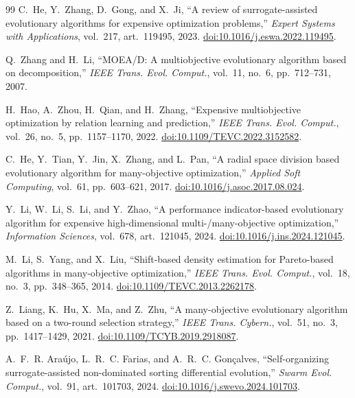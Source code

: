 \documentclass[final,5p,times,twocolumn]{elsarticle}
\begin{document}
\begin{thebibliography}{99}
C.~He, Y.~Zhang, D.~Gong, and X.~Ji,
``A review of surrogate-assisted evolutionary algorithms for expensive
optimization problems,'' \emph{Expert Systems with Applications}, vol.~217,
art.~119495, 2023.
\href{https://doi.org/10.1016/j.eswa.2022.119495}{doi:10.1016/j.eswa.2022.119495}.

Q.~Zhang and H.~Li,
``MOEA/D: A multiobjective evolutionary algorithm based on decomposition,''
\emph{IEEE Trans. Evol. Comput.}, vol.~11, no.~6, pp.~712--731, 2007.

H.~Hao, A.~Zhou, H.~Qian, and H.~Zhang,
``Expensive multiobjective optimization by relation learning and prediction,''
\emph{IEEE Trans. Evol. Comput.}, vol.~26, no.~5, pp.~1157--1170, 2022.
\href{https://doi.org/10.1109/TEVC.2022.3152582}{doi:10.1109/TEVC.2022.3152582}.

C.~He, Y.~Tian, Y.~Jin, X.~Zhang, and L.~Pan,
``A radial space division based evolutionary algorithm for many-objective
optimization,'' \emph{Applied Soft Computing}, vol.~61, pp.~603--621, 2017.
\href{https://doi.org/10.1016/j.asoc.2017.08.024}{doi:10.1016/j.asoc.2017.08.024}.

Y.~Li, W.~Li, S.~Li, and Y.~Zhao,
``A performance indicator-based evolutionary algorithm for expensive
high-dimensional multi-/many-objective optimization,''
\emph{Information Sciences}, vol.~678, art.~121045, 2024.
\href{https://doi.org/10.1016/j.ins.2024.121045}{doi:10.1016/j.ins.2024.121045}.

M.~Li, S.~Yang, and X.~Liu,
``Shift-based density estimation for Pareto-based algorithms in
many-objective optimization,''
\emph{IEEE Trans. Evol. Comput.}, vol.~18, no.~3, pp.~348--365, 2014.
\href{https://doi.org/10.1109/TEVC.2013.2262178}{doi:10.1109/TEVC.2013.2262178}.

Z.~Liang, K.~Hu, X.~Ma, and Z.~Zhu,
``A many-objective evolutionary algorithm based on a two-round selection
strategy,'' \emph{IEEE Trans. Cybern.}, vol.~51, no.~3, pp.~1417--1429, 2021.
\href{https://doi.org/10.1109/TCYB.2019.2918087}{doi:10.1109/TCYB.2019.2918087}.

A.~F.~R. Ara\'ujo, L.~R.~C. Farias, and A.~R.~C. Gon\c{c}alves,
``Self-organizing surrogate-assisted non-dominated sorting differential
evolution,'' \emph{Swarm Evol. Comput.}, vol.~91, art.~101703, 2024.
\href{https://doi.org/10.1016/j.swevo.2024.101703}{doi:10.1016/j.swevo.2024.101703}.


\end{thebibliography}
\end{document}
